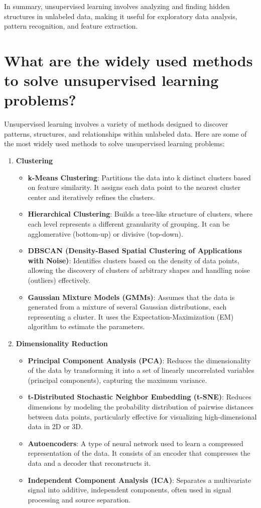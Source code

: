 \documentclass{article}
\begin{document}
In summary, unsupervised learning involves analyzing and finding hidden structures in unlabeled data, making it useful for exploratory data analysis, pattern recognition, and feature extraction.

\section{What are the widely used methods to solve unsupervised learning problems?}
Unsupervised learning involves a variety of methods designed to discover patterns, structures, and relationships within unlabeled data. Here are some of the most widely used methods to solve unsupervised learning problems:

\begin{enumerate}
    \item \textbf{Clustering}
    \begin{itemize}
        \item \textbf{k-Means Clustering}: Partitions the data into k distinct clusters based on feature similarity. It assigns each data point to the nearest cluster center and iteratively refines the clusters.
        \item \textbf{Hierarchical Clustering}: Builds a tree-like structure of clusters, where each level represents a different granularity of grouping. It can be agglomerative (bottom-up) or divisive (top-down).
        \item \textbf{DBSCAN (Density-Based Spatial Clustering of Applications with Noise)}: Identifies clusters based on the density of data points, allowing the discovery of clusters of arbitrary shapes and handling noise (outliers) effectively.
        \item \textbf{Gaussian Mixture Models (GMMs)}: Assumes that the data is generated from a mixture of several Gaussian distributions, each representing a cluster. It uses the Expectation-Maximization (EM) algorithm to estimate the parameters.
    \end{itemize}

    \item \textbf{Dimensionality Reduction}
    \begin{itemize}
        \item \textbf{Principal Component Analysis (PCA)}: Reduces the dimensionality of the data by transforming it into a set of linearly uncorrelated variables (principal components), capturing the maximum variance.
        \item \textbf{t-Distributed Stochastic Neighbor Embedding (t-SNE)}: Reduces dimensions by modeling the probability distribution of pairwise distances between data points, particularly effective for visualizing high-dimensional data in 2D or 3D.
        \item \textbf{Autoencoders}: A type of neural network used to learn a compressed representation of the data. It consists of an encoder that compresses the data and a decoder that reconstructs it.
        \item \textbf{Independent Component Analysis (ICA)}: Separates a multivariate signal into additive, independent components, often used in signal processing and source separation.
    \end{itemize}


\end{enumerate}
\end{document}

